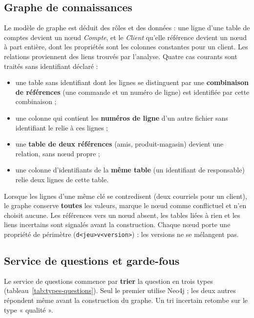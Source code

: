 \subsection{Graphe de connaissances}

Le modèle de graphe est déduit des rôles et des données : une ligne d'une table de comptes devient un nœud \textit{Compte}, et le \textit{Client} qu'elle référence devient un nœud à part entière, dont les propriétés sont les colonnes constantes pour un client. Les relations proviennent des liens trouvés par l'analyse. Quatre cas courants sont traités sans identifiant déclaré :
\begin{itemize}
  \item une table sans identifiant dont les lignes se distinguent par une \textbf{combinaison de références} (une commande et un numéro de ligne) est identifiée par cette combinaison ;
  \item une colonne qui contient les \textbf{numéros de ligne} d'un autre fichier sans identifiant le relie à ces lignes ;
  \item une \textbf{table de deux références} (amis, produit-magasin) devient une relation, sans nœud propre ;
  \item une colonne d'identifiants de la \textbf{même table} (un identifiant de responsable) relie deux lignes de cette table.
\end{itemize}
Lorsque les lignes d'une même clé se contredisent (deux courriels pour un client), le graphe conserve \textbf{toutes} les valeurs, marque le nœud comme conflictuel et n'en choisit aucune. Les références vers un nœud absent, les tables liées à rien et les liens incertains sont signalés avant la construction. Chaque nœud porte une propriété de périmètre (\texttt{d<jeu>v<version>}) : les versions ne se mélangent pas.

\subsection{Service de questions et garde-fous}\label{sec:questions-conception}

Le service de questions commence par \textbf{trier} la question en trois types (tableau~\ref{tab:types-questions}). Seul le premier utilise Neo4j ; les deux autres répondent même avant la construction du graphe. Un tri incertain retombe sur le type « qualité ».

